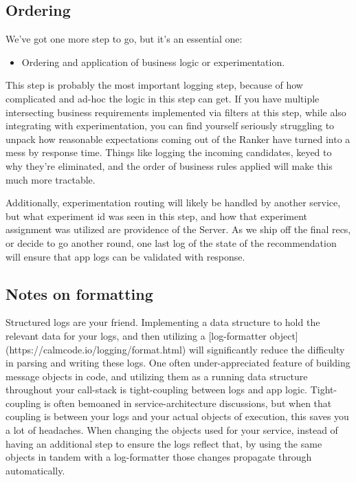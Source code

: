 \subsection{Ordering}

We've got one more step to go, but it's an essential one:

\begin{itemize}
\item Ordering and application of business logic or experimentation.
\end{itemize}

This step is probably the most important logging step, because of how complicated and ad-hoc the logic in this step can get. If you have multiple intersecting business requirements implemented via filters at this step, while also integrating with experimentation, you can find yourself seriously struggling to unpack how reasonable expectations coming out of the Ranker have turned into a mess by response time. Things like logging the incoming candidates, keyed to why they're eliminated, and the order of business rules applied will make this much more tractable.

Additionally, experimentation routing will likely be handled by another service, but what experiment id was seen in this step, and how that experiment assignment was utilized are providence of the Server. As we ship off the final recs, or decide to go another round, one last log of the state of the recommendation will ensure that app logs can be validated with response.

\subsection{Notes on formatting}

Structured logs are your friend. Implementing a data structure to hold the relevant data for your logs, and then utilizing a [log-formatter object](https://calmcode.io/logging/format.html) will significantly reduce the difficulty in parsing and writing these logs. One often under-appreciated feature of building message objects in code, and utilizing them as a running data structure throughout your call-stack is tight-coupling between logs and app logic. Tight-coupling is often  bemoaned in service-architecture discussions, but when that coupling is between your logs and your actual objects of execution, this saves you a lot of headaches. When changing the objects used for your service, instead of having an additional step to ensure the logs reflect that, by using the same objects in tandem with a log-formatter those changes propagate through automatically. 


